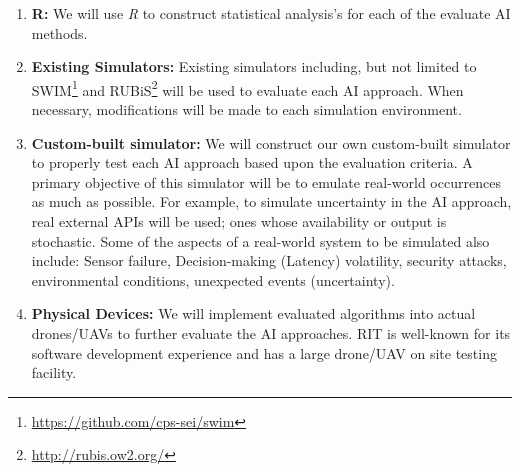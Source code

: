 \documentclass{article}
\begin{document}
\begin{enumerate}[noitemsep]
    
	\item \textbf{R:} We will use \emph{R} to construct statistical analysis's for each of the evaluate AI methods.
	\item \textbf{Existing Simulators:} Existing simulators including, but not limited to SWIM\footnote{\url{https://github.com/cps-sei/swim}} and RUBiS\footnote{\url{http://rubis.ow2.org/}} will be used to evaluate each AI approach. When necessary, modifications will be made to each simulation environment.    
	\item \textbf{Custom-built simulator:} We will construct our own custom-built simulator to properly test each AI approach based upon the evaluation criteria. A primary objective of this simulator will be to emulate real-world occurrences as much as possible. For example, to simulate uncertainty in the AI approach, real external APIs will be used; ones whose availability or output is stochastic. Some of the aspects of a real-world system to be simulated also include: Sensor failure, Decision-making (Latency) volatility, security attacks, environmental conditions, unexpected events (uncertainty).
	\item \textbf{Physical Devices:} We will implement evaluated algorithms into actual drones/UAVs to further evaluate the AI approaches. RIT is well-known for its software development experience and has a large drone/UAV on site testing facility.    
    
    

\end{enumerate}
















%	






%
%
\end{document}
